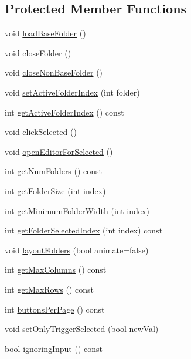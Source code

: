 \subsection*{Protected Member Functions}
\begin{DoxyCompactItemize}
\item 
void \mbox{\hyperlink{classAppMenuComponent_ada3fb52b04dd685b0f84c1870ed4bad2}{load\+Base\+Folder}} ()
\item 
void \mbox{\hyperlink{classAppMenuComponent_ab129bc87304b1dddfe497599bdcb9051}{close\+Folder}} ()
\item 
void \mbox{\hyperlink{classAppMenuComponent_a7de278fbb7a5e3a0986fe2311d54b72f}{close\+Non\+Base\+Folder}} ()
\item 
void \mbox{\hyperlink{classAppMenuComponent_ad71e8e46bc22b655363acefcb2c071b5}{set\+Active\+Folder\+Index}} (int folder)
\item 
int \mbox{\hyperlink{classAppMenuComponent_a2200f8d6fa8179d064531b338c20254b}{get\+Active\+Folder\+Index}} () const
\item 
void \mbox{\hyperlink{classAppMenuComponent_a489731e0173f2e22392403326957b402}{click\+Selected}} ()
\item 
void \mbox{\hyperlink{classAppMenuComponent_ad102ea087cd87c48e44e71b56e9023aa}{open\+Editor\+For\+Selected}} ()
\item 
int \mbox{\hyperlink{classAppMenuComponent_aa42fbf211b823e0fe37f531caea7f148}{get\+Num\+Folders}} () const
\item 
int \mbox{\hyperlink{classAppMenuComponent_a82eba35fa1f3a80ba178d30b6889d49e}{get\+Folder\+Size}} (int index)
\item 
int \mbox{\hyperlink{classAppMenuComponent_a454aa10ad1fe085dce2e960dd810c8e4}{get\+Minimum\+Folder\+Width}} (int index)
\item 
int \mbox{\hyperlink{classAppMenuComponent_aabc1b6657b6cea28d9f94c3530ccfcff}{get\+Folder\+Selected\+Index}} (int index) const
\item 
void \mbox{\hyperlink{classAppMenuComponent_a1c90f9d6cecddc3473abc706faa1fcc9}{layout\+Folders}} (bool animate=false)
\item 
int \mbox{\hyperlink{classAppMenuComponent_aa389abb2f459a479a732d4c93f339163}{get\+Max\+Columns}} () const
\item 
int \mbox{\hyperlink{classAppMenuComponent_a66c23d297d5ce0fe96895310e891189a}{get\+Max\+Rows}} () const
\item 
int \mbox{\hyperlink{classAppMenuComponent_ac49b72c82ee49d659702df629206c3ed}{buttons\+Per\+Page}} () const
\item 
void \mbox{\hyperlink{classAppMenuComponent_aadc7aa3e03fa89fd6dc9d0c73b46f644}{set\+Only\+Trigger\+Selected}} (bool new\+Val)
\item 
bool \mbox{\hyperlink{classAppMenuComponent_a1a74b9fcc52b97ecac24fbd95d77102e}{ignoring\+Input}} () const
\end{DoxyCompactItemize}


